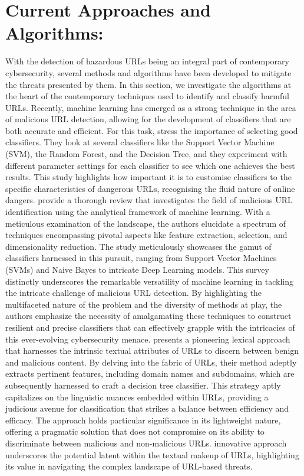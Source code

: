 \section{Current Approaches and Algorithms:}
With the detection of hazardous URLs being an integral part of contemporary cybersecurity, several methods and algorithms have been developed to mitigate the threats presented by them. In this section, we investigate the algorithms at the heart of the contemporary techniques used to identify and classify harmful URLs. Recently, machine learning has emerged as a strong technique in the area of malicious URL detection, allowing for the development of classifiers that are both accurate and efficient. For this task, \cite{liu2018finding} stress the importance of selecting good classifiers. They look at several classifiers like the Support Vector Machine (SVM), the Random Forest, and the Decision Tree, and they experiment with different parameter settings for each classifier to see which one achieves the best results. This study highlights how important it is to customise classifiers to the specific characteristics of dangerous URLs, recognising the fluid nature of online dangers.
\cite{sahoo2017malicious} provide a thorough review that investigates the field of malicious URL identification using the analytical framework of machine learning. With a meticulous examination of the landscape, the authors elucidate a spectrum of techniques encompassing pivotal aspects like feature extraction, selection, and dimensionality reduction. The study meticulously showcases the gamut of classifiers harnessed in this pursuit, ranging from Support Vector Machines (SVMs) and Naive Bayes to intricate Deep Learning models. This survey distinctly underscores the remarkable versatility of machine learning in tackling the intricate challenge of malicious URL detection. By highlighting the multifaceted nature of the problem and the diversity of methods at play, the authors emphasize the necessity of amalgamating these techniques to construct resilient and precise classifiers that can effectively grapple with the intricacies of this ever-evolving cybersecurity menace.
\cite{darling2015lexical} presents a pioneering lexical approach that harnesses the intrinsic textual attributes of URLs to discern between benign and malicious content. By delving into the fabric of URLs, their method adeptly extracts pertinent features, including domain names and subdomains, which are subsequently harnessed to craft a decision tree classifier. This strategy aptly capitalizes on the linguistic nuances embedded within URLs, providing a judicious avenue for classification that strikes a balance between efficiency and efficacy. The approach holds particular significance in its lightweight nature, offering a pragmatic solution that does not compromise on its ability to discriminate between malicious and non-malicious URLs. \cite{darling2015lexical} innovative approach underscores the potential latent within the textual makeup of URLs, highlighting its value in navigating the complex landscape of URL-based threats.
